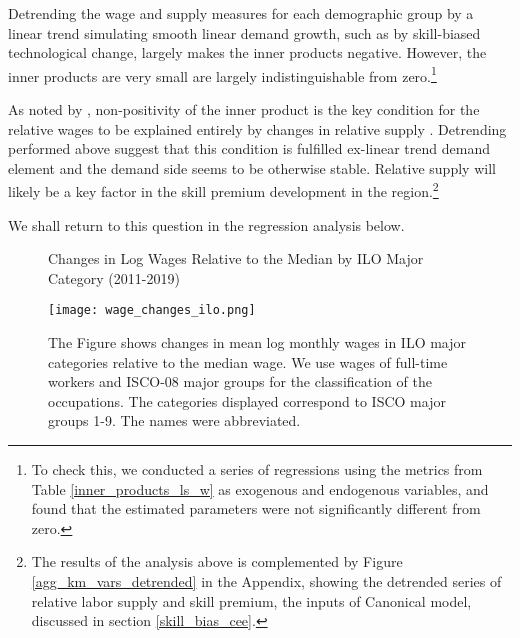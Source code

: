 \documentclass[11pt]{article}
\begin{document}
Detrending the wage and supply measures for each demographic group by a linear trend simulating smooth linear demand growth, such as by skill-biased technological change, largely makes the inner products negative. However, the inner products are very small are largely indistinguishable from zero.\footnote{To check this, we conducted a series of regressions using the metrics from Table \ref{inner_products_ls_w} as exogenous and endogenous variables, and found that the estimated parameters were not significantly different from zero.}

As noted by \citeauthor{katz1992changes}, non-positivity of the inner product is the key condition for the relative wages to be explained entirely by changes in relative supply . Detrending performed above suggest that this condition is fulfilled ex-linear trend demand element and the demand side seems to be otherwise stable. Relative supply will likely be a key factor in the skill premium development in the region.\footnote{ The results of the analysis above is complemented by Figure \ref{agg_km_vars_detrended} in the Appendix, showing the detrended series of relative labor supply and skill premium, the inputs of Canonical model, discussed in section \ref{skill_bias_cee}. %
}

We shall return to this question in the regression analysis below.




\begin{figure}[!htbp]%
\centering
    \caption{Changes in Log Wages Relative to the Median by ILO Major Category (2011-2019)}
    {\texttt{[image: wage\_changes\_ilo.png]} }
    \caption*{\footnotesize The Figure shows changes in mean log monthly wages in ILO major categories relative to the median wage. We use wages of full-time workers and ISCO-08 major groups for the classification of the occupations. The categories displayed correspond to ISCO major groups 1-9. The names were abbreviated.}
\label{wage_changes_ilo}
\end{figure}
\end{document}
